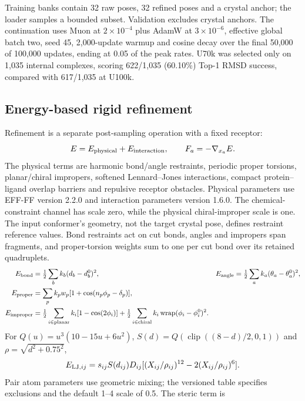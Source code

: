 Training banks contain 32 raw poses, 32 refined poses and a crystal anchor;
the loader samples a bounded subset. Validation excludes crystal anchors.
The continuation uses Muon at $2\times10^{-4}$ plus AdamW at $3\times10^{-6}$,
effective global batch two, seed 45, 2,000-update warmup and cosine decay over
the final 50,000 of 100,000 updates, ending at 0.05 of the peak rates.
U70k was selected only on 1,035 internal complexes, scoring 622/1,035 (60.10\%)
Top-1 RMSD success, compared with 617/1,035 at U100k.

\subsection{Energy-based rigid refinement}
Refinement is a separate post-sampling operation with a fixed receptor:
\begin{equation}
 E=E_{\rm physical}+E_{\rm interaction},\qquad F_a=-\nabla_{x_a}E.
 \label{eq:effdock-energy}
\end{equation}
The physical terms are harmonic bond/angle restraints, periodic proper
torsions, planar/chiral impropers, softened Lennard--Jones interactions,
compact protein--ligand overlap barriers and repulsive receptor obstacles.
Physical parameters use EFF-FF version 2.2.0 and interaction parameters version
1.6.0. The chemical-constraint channel has scale zero, while the physical
chiral-improper scale is one. The input conformer's geometry, not the target
crystal pose, defines restraint reference values.
Bond restraints act on cut bonds, angles and impropers span fragments, and
proper-torsion weights sum to one per cut bond over its retained quadruplets.
\begin{align}
 E_{\rm bond}&=\tfrac12\sum_bk_b(d_b-d_b^0)^2,&
 E_{\rm angle}&=\tfrac12\sum_ak_a(\theta_a-\theta_a^0)^2,\\
 E_{\rm proper}&=\sum_pk_pw_p[1+\cos(n_p\phi_p-\delta_p)],\\
 E_{\rm improper}&=\tfrac12\sum_{i\in\rm planar}k_i[1-\cos(2\phi_i)]
 +\tfrac12\sum_{i\in\rm chiral}k_i\operatorname{wrap}(\phi_i-\phi_i^0)^2.
\end{align}
For $Q(u)=u^3(10-15u+6u^2)$, $S(d)=Q(\operatorname{clip}((8-d)/2,0,1))$
and $\rho=\sqrt{d^2+0.75^2}$,
\begin{equation}
 E_{{\rm LJ},ij}=s_{ij}S(d_{ij})D_{ij}
 [(X_{ij}/\rho_{ij})^{12}-2(X_{ij}/\rho_{ij})^6].
\end{equation}
Pair atom parameters use geometric mixing; the versioned table specifies
exclusions and the default 1--4 scale of 0.5. The steric term is
